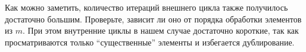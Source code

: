 Как можно заметить, количество итераций внешнего цикла также получилось достаточно большим.
Проверьте, зависит ли оно от порядка обработки элементов из $m$.
При этом внутренние циклы в нашем случае достаточно короткие, так как просматриваются только \enquote{существенные} элементы и избегается дублирование.

%
%
%
%
%
%
%
